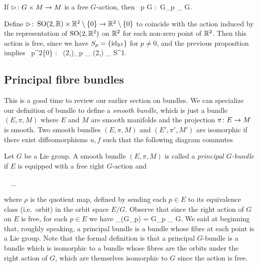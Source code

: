 \bp
If $\vartriangleright\colon G \times M \to M$ is a free $G$-action, then
\bse
\forall \, p \in G :\ G_p \cong_{} G.
\ese
\ep

\be
Define $\vartriangleright\colon \operatorname{SO}(2,\mathbb{R})\times \mathbb{R}^2\setminus\{0\}\to \mathbb{R}^2\setminus\{0\}$ to coincide with the action induced by the representation of $\operatorname{SO}(2,\mathbb{R}^2)$ on $\mathbb{R}^2$ for each non-zero point of $\mathbb{R}^2$. Then this action is free, since we have $S_p=\{\operatorname{id}_{\mathbb{R}^2}\}$ for $p\neq 0$, and the previous proposition implies
\bse
\forall \, p\in \R^2\sm\{0\} : \ \SO(2,\R)_p \cong_{} \SO(2,\R) \cong_{} S^1.
\ese
\ee

\subsection{Principal fibre bundles}

This is a good time to review our earlier section on bundles. We can specialize our definition of bundle to define a \emph{smooth bundle}, which is just a bundle $(E,\pi,M)$ where $E$ and $M$ are smooth manifolds and the projection $\pi\colon E\to M$ is smooth. Two smooth bundles $(E,\pi,M)$ and $(E',\pi',M')$ are isomorphic if there exist diffeomorphisms $u,f$ such that the following diagram commutes
\bse
{}
\ese

\bd
Let $G$ be a Lie group. A smooth bundle $(E,\pi,M)$ is called a \emph{principal $G$-bundle} if $E$ is equipped with a free right $G$-action and
\bse
{}
\ \ \cong_{}
\ese
where $\rho$ is the quotient map, defined by sending each $p\in E$ to its equivalence class (i.e.\ orbit) in the orbit space $E/G$.
\ed
Observe that since the right action of $G$ on $E$ is free, for each $p\in E$ we have
\bse
\preim_\rho(G_p) = G_p \cong_{} G.
\ese
We said at beginning that, roughly speaking, a principal bundle is a bundle whose fibre at each point is a Lie group. Note that the formal definition is that a principal $G$-bundle is a bundle which is isomorphic to a bundle whose fibres are the orbits under the right action of $G$, which are themselves isomorphic to $G$ since the action is free.

